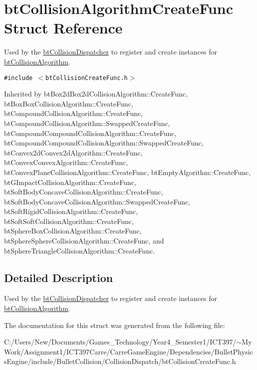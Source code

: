 \hypertarget{structbt_collision_algorithm_create_func}{
\section{btCollisionAlgorithmCreateFunc Struct Reference}
\label{structbt_collision_algorithm_create_func}
}
Used by the \hyperlink{classbt_collision_dispatcher}{btCollisionDispatcher} to register and create instances for \hyperlink{classbt_collision_algorithm}{btCollisionAlgorithm}.  


{\tt \#include $<$btCollisionCreateFunc.h$>$}

Inherited by btBox2dBox2dCollisionAlgorithm::CreateFunc, btBoxBoxCollisionAlgorithm::CreateFunc, btCompoundCollisionAlgorithm::CreateFunc, btCompoundCollisionAlgorithm::SwappedCreateFunc, btCompoundCompoundCollisionAlgorithm::CreateFunc, btCompoundCompoundCollisionAlgorithm::SwappedCreateFunc, btConvex2dConvex2dAlgorithm::CreateFunc, btConvexConvexAlgorithm::CreateFunc, btConvexPlaneCollisionAlgorithm::CreateFunc, btEmptyAlgorithm::CreateFunc, btGImpactCollisionAlgorithm::CreateFunc, btSoftBodyConcaveCollisionAlgorithm::CreateFunc, btSoftBodyConcaveCollisionAlgorithm::SwappedCreateFunc, btSoftRigidCollisionAlgorithm::CreateFunc, btSoftSoftCollisionAlgorithm::CreateFunc, btSphereBoxCollisionAlgorithm::CreateFunc, btSphereSphereCollisionAlgorithm::CreateFunc, and btSphereTriangleCollisionAlgorithm::CreateFunc.



\subsection{Detailed Description}
Used by the \hyperlink{classbt_collision_dispatcher}{btCollisionDispatcher} to register and create instances for \hyperlink{classbt_collision_algorithm}{btCollisionAlgorithm}. 

The documentation for this struct was generated from the following file:\begin{CompactItemize}
\item 
C:/Users/New/Documents/Games\_\-Technology/Year4\_\-Semester1/ICT397/$\sim$My Work/Assignment1/ICT397Carre/CarreGameEngine/Dependencies/BulletPhysicsEngine/include/BulletCollision/CollisionDispatch/btCollisionCreateFunc.h\end{CompactItemize}
